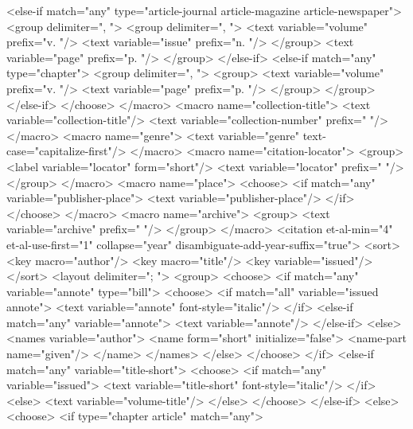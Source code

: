       <else-if match="any" type="article-journal article-magazine article-newspaper">
        <group delimiter=", ">
          <group delimiter=", ">
            <text variable="volume" prefix="v. "/>
            <text variable="issue" prefix="n. "/>
          </group>
          <text variable="page" prefix="p. "/>
        </group>
      </else-if>
      <else-if match="any" type="chapter">
        <group delimiter=", ">
          <group>
            <text variable="volume" prefix="v. "/>
            <text variable="page" prefix="p. "/>
          </group>
        </group>
      </else-if>
    </choose>
  </macro>
  <macro name="collection-title">
    <text variable="collection-title"/>
    <text variable="collection-number" prefix=" "/>
  </macro>
  <macro name="genre">
    <text variable="genre" text-case="capitalize-first"/>
  </macro>
  <macro name="citation-locator">
    <group>
      <label variable="locator" form="short"/>
      <text variable="locator" prefix=" "/>
    </group>
  </macro>
  <macro name="place">
    <choose>
      <if match="any" variable="publisher-place">
        <text variable="publisher-place"/>
      </if>
    </choose>
  </macro>
  <macro name="archive">
    <group>
      <text variable="archive" prefix=" "/>
    </group>
  </macro>
  <citation et-al-min="4" et-al-use-first="1" collapse="year" disambiguate-add-year-suffix="true">
    <sort>
      <key macro="author"/>
      <key macro="title"/>
      <key variable="issued"/>
    </sort>
    <layout delimiter="; ">
      <group>
        <choose>
          <if match="any" variable="annote" type="bill">
            <choose>
              <if match="all" variable="issued annote">
                <text variable="annote" font-style="italic"/>
              </if>
              <else-if match="any" variable="annote">
                <text variable="annote"/>
              </else-if>
              <else>
                <names variable="author">
                  <name form="short" initialize="false">
                    <name-part name="given"/>
                  </name>
                </names>
              </else>
            </choose>
          </if>
          <else-if match="any" variable="title-short">
            <choose>
              <if match="any" variable="issued">
                <text variable="title-short" font-style="italic"/>
              </if>
              <else>
                <text variable="volume-title"/>
              </else>
            </choose>
          </else-if>
          <else>
            <choose>
              <if type="chapter article" match="any">
